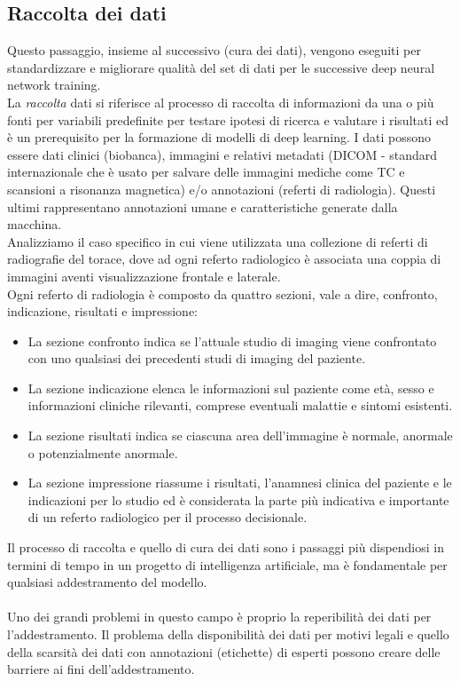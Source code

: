 \documentclass[12pt,a4paper]{report}
\begin{document}
\subsection{Raccolta dei dati}
Questo passaggio, insieme al successivo (cura dei dati), vengono eseguiti per standardizzare e migliorare qualità del set di dati per le successive deep neural network training.\\
La \emph{raccolta} dati si riferisce al processo di raccolta di informazioni da una o più fonti per variabili predefinite per testare ipotesi di ricerca e valutare i risultati ed è un prerequisito per la formazione di modelli di deep learning. 
I dati possono essere dati clinici (biobanca), immagini e relativi metadati (DICOM - standard internazionale che è usato per salvare delle immagini mediche come TC e scansioni a risonanza magnetica) e/o annotazioni (referti di radiologia). Questi ultimi rappresentano annotazioni umane e caratteristiche generate dalla macchina.\\
Analizziamo il caso specifico in cui viene utilizzata una collezione di referti di radiografie del torace, dove ad ogni referto radiologico è associata una coppia di immagini aventi visualizzazione frontale e laterale.\\
Ogni referto di radiologia è composto da quattro sezioni, vale a dire, confronto, indicazione, risultati e impressione:
\begin{itemize}
    \item La sezione confronto indica se l'attuale studio di imaging viene confrontato con uno qualsiasi dei precedenti studi di imaging del paziente.
    \item La sezione indicazione elenca le informazioni sul paziente come età, sesso e informazioni cliniche rilevanti, comprese eventuali malattie e sintomi esistenti.
    \item La sezione risultati indica se ciascuna area dell'immagine è normale, anormale o potenzialmente anormale.
    \item La sezione impressione riassume i risultati, l'anamnesi clinica del paziente e le indicazioni per lo studio ed è considerata la parte più indicativa e importante di un referto radiologico per il processo decisionale.
\end{itemize}

Il processo di raccolta e quello di cura dei dati sono i passaggi più dispendiosi in termini di tempo in un progetto di intelligenza artificiale, ma è fondamentale per qualsiasi addestramento del modello.\\
\\
Uno dei grandi problemi in questo campo è proprio la reperibilità dei dati per l’addestramento.
Il problema della disponibilità dei dati per motivi legali e quello della scarsità dei dati con annotazioni (etichette) di esperti possono creare delle barriere ai fini dell’addestramento.
\end{document}
